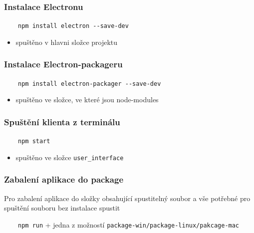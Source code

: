 \documentclass[11pt]{article}
\providecommand{\tightlist}{\setlength{\itemsep}{1pt}\setlength{\parskip}{1pt}}
\let\oldtexttt\texttt
\renewcommand{\texttt}[1]{\oldtexttt{\textcolor{codehighlight}{#1}}}
\begin{document}
\hypertarget{instalace-electronu}{%
\subsubsection{Instalace Electronu}\label{instalace-electronu}}

~~~~\texttt{npm\ install\ electron\ -\/-save-dev}

\begin{itemize}
\tightlist
\item
  spuštěno v hlavni složce projektu
\end{itemize}

\hypertarget{instalace-electron-packageru}{%
\subsubsection{Instalace
Electron-packageru}\label{instalace-electron-packageru}}

~~~~\texttt{npm\ install\ electron-packager\ -\/-save-dev}

\begin{itemize}
\tightlist
\item
  spuštěno ve složce, ve které jsou node-modules
\end{itemize}

\hypertarget{spuux161tux11bnuxed-klienta-z-terminuxe1lu}{%
\subsubsection{Spuštění klienta z
terminálu}\label{spuux161tux11bnuxed-klienta-z-terminuxe1lu}}

~~~~\texttt{npm\ start}

\begin{itemize}
\tightlist
\item
  spuštěno ve složce \texttt{user\_interface}
\end{itemize}

\hypertarget{zabalenuxed-aplikace-do-package}{%
\subsubsection{Zabalení aplikace do
package}\label{zabalenuxed-aplikace-do-package}}

Pro zabalení aplikace do složky obsahující spustitelný soubor a vše
potřebné pro spuštění souboru bez instalace spustit

~~~~\texttt{npm\ run} + jedna z možností
\texttt{package-win/package-linux/pakcage-mac}
\end{document}
